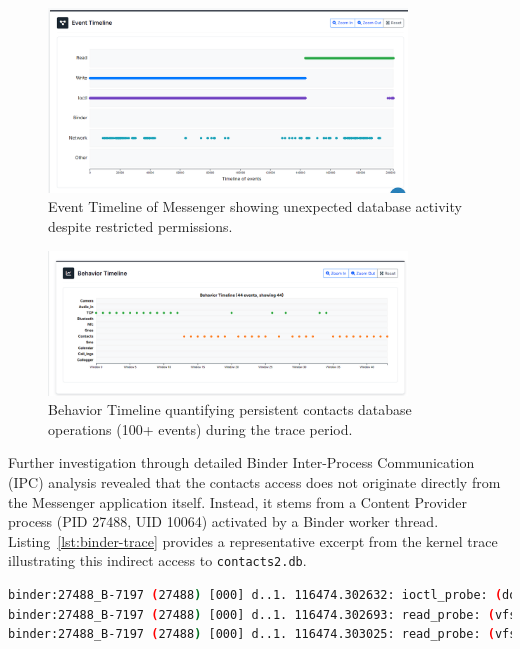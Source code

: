 \documentclass[a4paper,12pt]{report}
\begin{document}
\begin{figure}[H]
    \centering
    \includegraphics[width=0.85\textwidth]{messenger-none-events.png}
    \caption{Event Timeline of Messenger showing unexpected database activity despite restricted permissions.}
    \label{fig:messenger-none-events}
\end{figure}

\begin{figure}[H]
    \centering
    \includegraphics[width=0.85\textwidth]{messenger-none-behav.png}
    \caption{Behavior Timeline quantifying persistent contacts database operations (100+ events) during the trace period.}
    \label{fig:messenger-none-behav}
\end{figure}
Further investigation through detailed Binder Inter-Process Communication (IPC) analysis revealed that the contacts access does not originate directly from the Messenger application itself. Instead, it stems from a Content Provider process (PID 27488, UID 10064) activated by a Binder worker thread. Listing~\ref{lst:binder-trace} provides a representative excerpt from the kernel trace illustrating this indirect access to \texttt{contacts2.db}.

\clearpage
\begin{lstlisting}[language=bash, caption={Kernel trace showing contacts database access via a Binder worker thread.}, label={lst:binder-trace}]
binder:27488_B-7197 (27488) [000] d..1. 116474.302632: ioctl_probe: (do_vfs_ioctl) file=... pathname="contacts2.db"
binder:27488_B-7197 (27488) [000] d..1. 116474.302693: read_probe: (vfs_read) file=... buf=... count=100 pathname="contacts2.db"
binder:27488_B-7197 (27488) [000] d..1. 116474.303025: read_probe: (vfs_read) file=... count=4096 pathname="contacts2.db"
\end{lstlisting}
\end{document}
